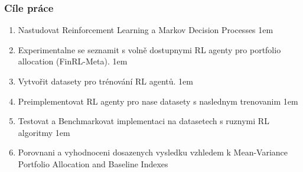 




%
%

\begin{frame}
    \frametitle{Cíle práce}
    \begin{enumerate}
        \itemsep1em
        \item Nastudovat Reinforcement Learning a Markov Decision Processes
        \itemsep1em
        \item Experimentalne se seznamit s volně dostupnymi RL agenty pro portfolio allocation (FinRL-Meta).
        \itemsep1em
        \item Vytvořit datasety pro trénování RL agentů.
        \itemsep1em
        \item Preimplementovat RL agenty pro nase datasety s naslednym trenovanim
        \itemsep1em
        \item Testovat a Benchmarkovat implementaci na datasetech s ruznymi RL algoritmy
        \itemsep1em
        \item Porovnani a vyhodnoceni dosazenych vysledku vzhledem k Mean-Variance Portfolio Allocation and Baseline Indexes
    \end{enumerate}
\end{frame}

